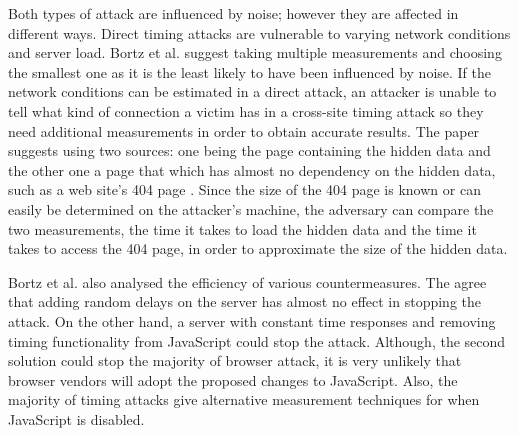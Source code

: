 \documentclass[10pt,a4paper,twoside]{book}
\begin{document}
Both types of attack are influenced by noise; however they are affected in different ways. Direct timing attacks are vulnerable to varying network conditions and server load. Bortz et al. suggest taking multiple measurements and choosing the smallest one as it is the least likely to have been influenced by noise. If the network conditions can be estimated in a direct attack, an attacker is unable to tell what kind of connection a victim has in a cross-site timing attack so they need additional measurements in order to obtain accurate results. The paper suggests using two sources: one being the page containing the hidden data and the other one a page that which has almost no dependency on the hidden data, such as a web site's 404 page \cite{bortz2007exposing}. 
Since the size of the 404 page is known or can easily be determined on the attacker's machine, the adversary can compare the two measurements, the time it takes to load the hidden data and the time it takes to access the 404 page, in order to approximate the size of the hidden data.

Bortz et al. also analysed the efficiency of various countermeasures. The agree that adding random delays on the server has almost no effect in stopping the attack. On the other hand, a server with constant time responses and removing timing functionality from JavaScript could stop the attack. Although, the second solution could stop the majority of browser attack, it is very unlikely that browser vendors will adopt the proposed changes to JavaScript. Also, the majority of timing attacks give alternative measurement techniques for when JavaScript is disabled.
\end{document}
